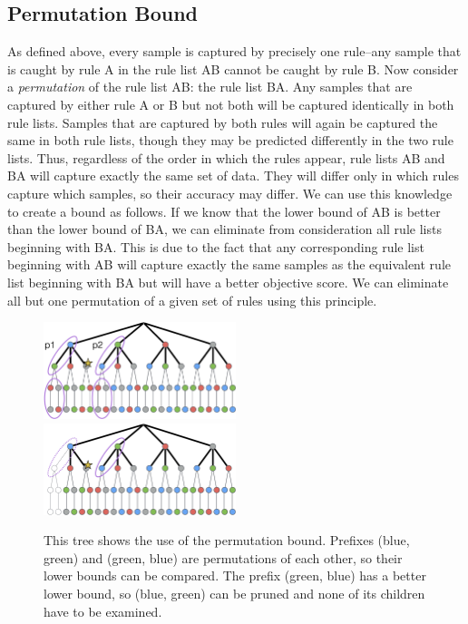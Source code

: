 \subsection{Permutation Bound}

As defined above, every sample is captured by precisely one rule--any sample that is caught by rule A in the rule list AB cannot be caught by rule B. 
Now consider a \textit{permutation} of the rule list AB: the rule list BA.
Any samples that are captured by either rule A or B but not both will be captured identically in both rule lists.
Samples that are captured by both rules will again be captured the same in both rule lists, though they may be predicted differently in the two rule lists.
Thus, regardless of the order in which the rules appear, rule lists AB and BA will capture exactly the same set of data.
They will differ only in which rules capture which samples, so their accuracy may differ. 
We can use this knowledge to create a bound as follows.
If we know that the lower bound of AB is better than the lower bound of BA, we can eliminate from consideration all rule lists beginning with BA.
This is due to the fact that any corresponding rule list beginning with AB will capture exactly the same samples as the equivalent rule list beginning with BA but will have a better objective score.
We can eliminate all but one permutation of a given set of rules using this principle.

\begin{figure}
\includegraphics[width=0.5\textwidth]{figs/ela_branch-and-bound-permutations.png}
\includegraphics[width=0.5\textwidth]{figs/ela_branch-and-bound-permutations-pruned.png}
\caption[Permutation bound]{This tree shows the use of the permutation bound. Prefixes (blue, green) and (green, blue) are permutations of each other, so their lower bounds can be compared. The prefix (green, blue) has a better lower bound, so (blue, green) can be pruned and none of its children have to be examined.
\label{fig:permutation-bound}}
\end{figure}

